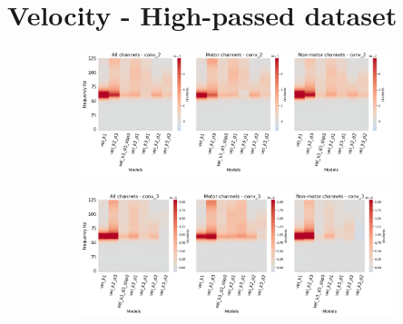 \section*{Velocity - High-passed dataset}\label{subsec:vel-high-passed-dataset-appendixA}
\begin{figure}[!htb]
\centering
\begin{subfigure}[a]{\textwidth}
   \includegraphics[width=0.9\linewidth]{img/appendix/A/conv-2/hp-m/vel-model-gradients_all_kinds}
   \caption{}
   \label{fig:vel-hp-grads-conv-2}
\end{subfigure}

\begin{subfigure}[b]{\textwidth}
   \includegraphics[width=0.9\linewidth]{img/appendix/A/conv-3/hp-m/vel-model-gradients_all_kinds}
   \caption{}
   \label{fig:vel-hp-grads-conv-3}
\end{subfigure}
\end{figure}
\clearpage   

